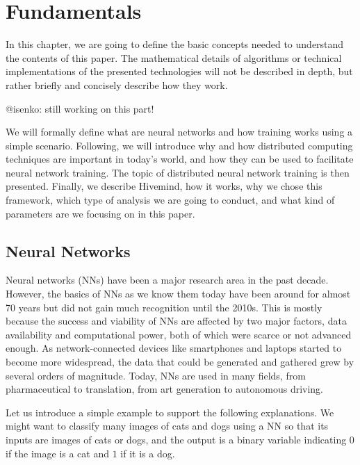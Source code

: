 \chapter{Fundamentals}\label{chapter:fundamentals}

In this chapter, we are going to define the basic concepts needed to understand the contents of this paper.
The mathematical details of algorithms or technical implementations of the presented technologies will not be described in depth, but rather briefly and concisely describe how they work.

@isenko: still working on this part!

We will formally define what are neural networks and how training works using a simple scenario.
Following, we will introduce why and how distributed computing techniques are important in today's world, and how they can be used to facilitate neural network training.
The topic of distributed neural network training is then presented.
Finally, we describe Hivemind, how it works, why we chose this framework, which type of analysis we are going to conduct, and what kind of parameters are we focusing on in this paper.

\section{Neural Networks}
Neural networks (NNs) have been a major research area in the past decade.
However, the basics of NNs as we know them today have been around for almost 70 years but did not gain much recognition until the 2010s.
This is mostly because the success and viability of NNs are affected by two major factors, data availability and computational power, both of which were scarce or not advanced enough.
As network-connected devices like smartphones and laptops started to become more widespread, the data that could be generated and gathered grew by several orders of magnitude.
Today, NNs are used in many fields, from pharmaceutical to translation, from art generation to autonomous driving.

Let us introduce a simple example to support the following explanations.
We might want to classify many images of cats and dogs using a NN so that its inputs are images of cats or dogs, and the output is a binary variable indicating $0$ if the image is a cat and $1$ if it is a dog.

